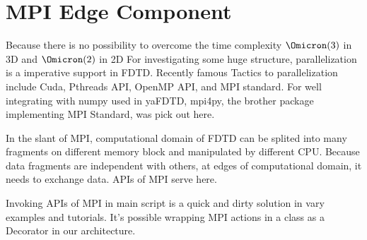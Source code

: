 \section{MPI Edge Component}
Because there is no possibility to overcome the time complexity $\Omicron (3)$ in 3D and $\Omicron (2)$ in 2D For
investigating some huge structure, parallelization is a imperative support in FDTD. Recently famous Tactics to
parallelization include Cuda, Pthreads API, OpenMP API, and MPI standard. For well integrating with numpy used in
yaFDTD, mpi4py, the brother package implementing MPI Standard, was pick out here. 

In the slant of MPI, computational domain of FDTD can be splited into many fragments on different memory block and
manipulated by different CPU. Because data fragments are independent with others, at edges of computational domain, it
needs to exchange data. APIs of MPI serve here.

Invoking APIs of MPI in main script is a quick and dirty solution in vary examples and tutorials. It's possible wrapping
MPI actions in a class as a Decorator in our architecture. 
\begin{code}
  
\end{code}

